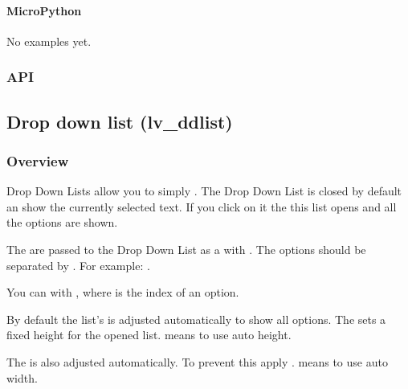 \documentclass[letterpaper,10pt,english]{sphinxmanual}
\begin{document}
\paragraph{MicroPython}
\label{\detokenize{object-types/cont:micropython}}
No examples yet.


\subsubsection{API}
\label{\detokenize{object-types/cont:api}}

\subsection{Drop down list (lv\_ddlist)}
\label{\detokenize{object-types/ddlist:drop-down-list-lv-ddlist}}\label{\detokenize{object-types/ddlist::doc}}

\subsubsection{Overview}
\label{\detokenize{object-types/ddlist:overview}}
Drop Down Lists allow you to simply . The Drop Down List is closed by default an show the currently selected text. If you click on it the this list opens and all the options are shown.

The  are passed to the Drop Down List as a  with . The options should be separated by . For example: .

You can  with , where  is the index of an option.

By default the list’s  is adjusted automatically to show all options. The  sets a fixed height for the opened list.  means to use auto height.

The  is also adjusted automatically. To prevent this apply .  means to use auto width.
\end{document}
